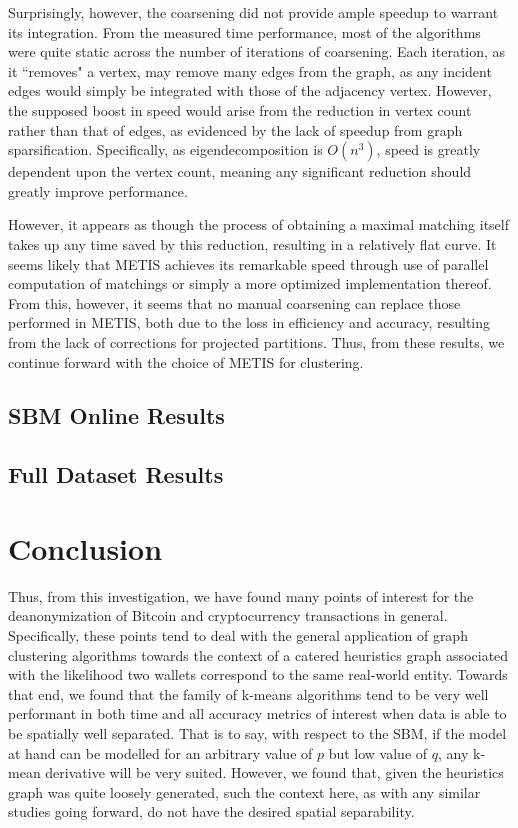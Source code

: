 \documentclass{article}
\begin{document}
Surprisingly, however, the coarsening did not provide ample speedup to warrant its integration. From the measured time performance, most of the algorithms were quite static across the number of iterations of coarsening. Each iteration, as it ``removes" a vertex, may remove many edges from the graph, as any incident edges would simply be integrated with those of the adjacency vertex. However, the supposed boost in speed would arise from the reduction in vertex count rather than that of edges, as evidenced by the lack of speedup from graph sparsification. Specifically, as eigendecomposition is $O(n^3)$, speed is greatly dependent upon the vertex count, meaning any significant reduction should greatly improve performance. 

However, it appears as though the process of obtaining a maximal matching itself takes up any time saved by this reduction, resulting in a relatively flat curve. It seems likely that METIS achieves its remarkable speed through use of parallel computation of matchings or simply a more optimized implementation thereof. From this, however, it seems that no manual coarsening can replace those performed in METIS, both due to the loss in efficiency and accuracy, resulting from the lack of corrections for projected partitions. Thus, from these results, we continue forward with the choice of METIS for clustering.

\subsection{SBM Online Results}

\subsection{Full Dataset Results}

\clearpage
\section{Conclusion}\label{conclusion}
Thus, from this investigation, we have found many points of interest for the deanonymization of Bitcoin and cryptocurrency transactions in general. Specifically, these points tend to deal with the general application of graph clustering algorithms towards the context of a catered heuristics graph associated with the likelihood two wallets correspond to the same real-world entity. Towards that end, we found that the family of k-means algorithms tend to be very well performant in both time and all accuracy metrics of interest when data is able to be spatially well separated. That is to say, with respect to the SBM, if the model at hand can be modelled for an arbitrary value of $p$ but low value of $q$, any k-mean derivative will be very suited. However, we found that, given the heuristics graph was quite loosely generated, such the context here, as with any similar studies going forward, do not have the desired spatial separability.
\end{document}
